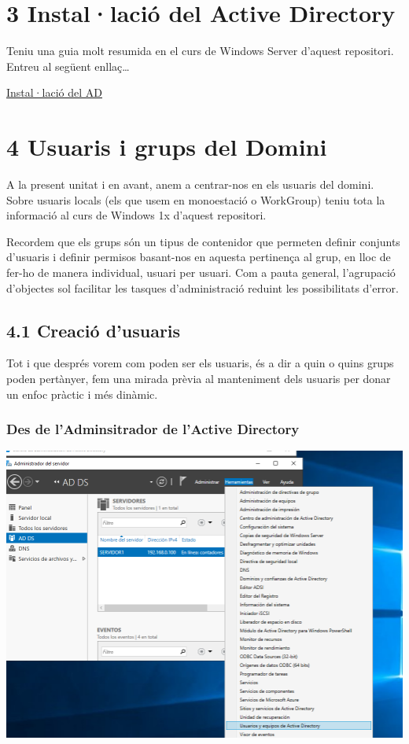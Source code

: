 \documentclass[
  a4paper,
]{article}
\begin{document}
\section{3 Instal·lació del Active
Directory}\label{installaciuxf3-del-active-directory}

Teniu una guia molt resumida en el curs de Windows Server d'aquest
repositori. Entreu al següent enllaç\ldots{}

\href{https://github.com/tofermos/Windows-Server/blob/main/md/ADDSenWindowsServerGUI.md}{Instal·lació
del AD}

\section{4 Usuaris i grups del Domini}\label{usuaris-i-grups-del-domini}

A la present unitat i en avant, anem a centrar-nos en els usuaris del
domini. Sobre usuaris locals (els que usem en monoestació o WorkGroup)
teniu tota la informació al curs de Windows 1x d'aquest repositori.

Recordem que els grups són un tipus de contenidor que permeten definir
conjunts d'usuaris i definir permisos basant-nos en aquesta pertinença
al grup, en lloc de fer-ho de manera individual, usuari per usuari. Com
a pauta general, l'agrupació d'objectes sol facilitar les tasques
d'administració reduint les possibilitats d'error.

\subsection{4.1 Creació d'usuaris}\label{creaciuxf3-dusuaris}

Tot i que després vorem com poden ser els usuaris, és a dir a quin o
quins grups poden pertànyer, fem una mirada prèvia al manteniment dels
usuaris per donar un enfoc pràctic i més dinàmic.

\subsubsection{Des de l'Adminsitrador de l'Active
Directory}\label{des-de-ladminsitrador-de-lactive-directory}

\includegraphics{png/usuaris1.png}
\end{document}
